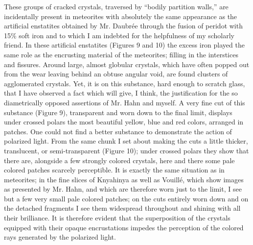 \documentclass[a4paper, 12pt, oneside]{article}
\begin{document}
These groups of cracked crystals, traversed by ``bodily partition walls,'' are incidentally present in meteorites with absolutely the same appearance as the artificial enstatites obtained by Mr. Daubrée through the fusion of peridot with 15\% soft iron and to which I am indebted for the helpfulness of my scholarly friend. In these artificial enstatites (Figures 9 and 10) the excess iron played the same role as the encrusting material of the meteorites; filling in the interstices and fissures. Around large, almost globular crystals, which have often popped out from the wear leaving behind an obtuse angular void, are found clusters of agglomerated crystals. Yet, it is on this substance, hard enough to scratch glass, that I have observed a fact which will give, I think, the justification for the so diametrically opposed assertions of Mr. Hahn and myself. A very fine cut of this substance (Figure 9), transparent and worn down to the final limit, displays under crossed polars the most beautiful yellow, blue and red colors, arranged in patches. One could not find a better substance to demonstrate the action of polarized light. From the same chunk I set about making the cuts a little thicker, translucent, or semi-transparent (Figure 10); under crossed polars they show that there are, alongside a few strongly colored crystals, here and there some pale colored patches scarcely perceptible. It is exactly the same situation as in meteorites; in the fine slices of Knyahinya as well as Vouillé, which show images as presented by Mr. Hahn, and which are therefore worn just to the limit, I see but a few very small pale colored patches; on the cuts entirely worn down and on the detached fragments I see them widespread throughout and shining with all their brilliance. It is therefore evident that the superposition of the crystals equipped with their opaque encrustations impedes the perception of the colored rays generated by the polarized light.
\end{document}
